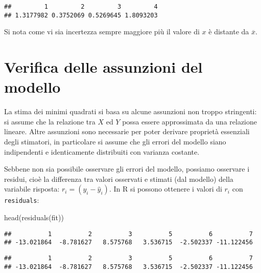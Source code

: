 \documentclass[
]{article}
\newenvironment{Shaded}{\begin{snugshade}}{\end{snugshade}}
\newcommand{\CommentTok}[1]{\textcolor[rgb]{0.56,0.35,0.01}{\textit{#1}}}
\newcommand{\FunctionTok}[1]{\textcolor[rgb]{0.00,0.00,0.00}{#1}}
\newcommand{\NormalTok}[1]{#1}
\newcommand{\SpecialCharTok}[1]{\textcolor[rgb]{0.00,0.00,0.00}{#1}}
\begin{document}
\begin{verbatim}
##         1         2         3         4 
## 1.3177982 0.3752069 0.5269645 1.8093203
\end{verbatim}

Si nota come vi sia incertezza sempre maggiore più il valore di \(x\) è
distante da \(\overline{x}\).

\hypertarget{verifica-delle-assunzioni-del-modello}{%
\section{Verifica delle assunzioni del
modello}\label{verifica-delle-assunzioni-del-modello}}

La stima dei minimi quadrati si basa su alcune assunzioni non troppo
stringenti: si assume che la relazione tra \(X\) ed \(Y\) possa essere
approssimata da una relazione lineare. Altre assunzioni sono necessarie
per poter derivare proprietà essenziali degli stimatori, in particolare
si assume che gli errori del modello siano indipendenti e identicamente
distribuiti con varianza costante.

Sebbene non sia possibile osservare gli errori del modello, possiamo
osservare i residui, cioè la differenza tra valori osservati e stimati
(dal modello) della variabile risposta: \(r_i = (y_i-\hat{y}_i)\). In R
si possono ottenere i valori di \(r_i\) con \texttt{residuals}:

\begin{Shaded}
\begin{Highlighting}[]
\FunctionTok{head}\NormalTok{(}\FunctionTok{residuals}\NormalTok{(fit))}
\end{Highlighting}
\end{Shaded}

\begin{verbatim}
##          1          2          3          5          6          7 
## -13.021864  -8.781627   8.575768   3.536715  -2.502337 -11.122456
\end{verbatim}

\begin{Shaded}
\end{Shaded}

\begin{verbatim}
##          1          2          3          5          6          7 
## -13.021864  -8.781627   8.575768   3.536715  -2.502337 -11.122456
\end{verbatim}
\end{document}
